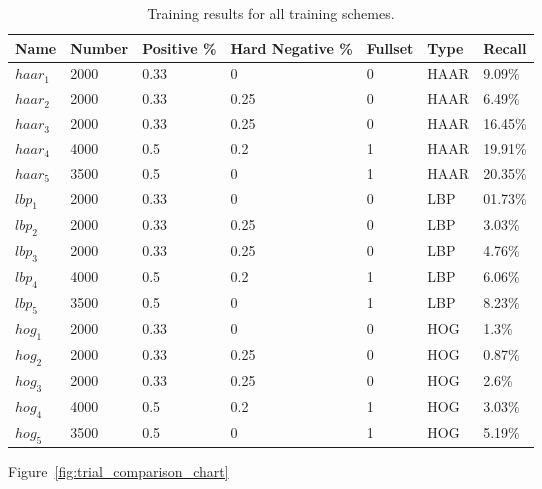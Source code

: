 \documentclass{llncs}
\begin{document}
{		\begin{table}[H]
			\centering
			\caption{Training results for all training schemes.}
			\label{tab:training_results}
			\begin{tabularx}{\textwidth}{XXllXXX}
				\toprule
				\textbf{Name} & \textbf{Number} & \textbf{Positive \%} & \textbf{Hard Negative \%} & \textbf{Fullset} & \textbf{Type} & \textbf{Recall} \\
				\midrule
					\(haar_1\) & 2000 & 0.33 & 0 & 0 & HAAR & 9.09\% \\
					\(haar_2\) & 2000 & 0.33 & 0.25 & 0 & HAAR & 6.49\% \\
					\(haar_3\) & 2000 & 0.33 & 0.25 & 0 & HAAR & 16.45\% \\
					\(haar_4\) & 4000 & 0.5 & 0.2 & 1 & HAAR & 19.91\% \\
					\(haar_5\) & 3500 & 0.5 & 0 & 1 & HAAR & 20.35\% \\
					\(lbp_1\) & 2000 & 0.33 & 0 & 0 & LBP & 01.73\% \\
					\(lbp_2\) & 2000 & 0.33 & 0.25 & 0 & LBP & 3.03\% \\
					\(lbp_3\) & 2000 & 0.33 & 0.25 & 0 & LBP & 4.76\% \\
					\(lbp_4\) & 4000 & 0.5 & 0.2 & 1 & LBP & 6.06\% \\
					\(lbp_5\) & 3500 & 0.5 & 0 & 1 & LBP & 8.23\% \\
					\(hog_1\) & 2000 & 0.33 & 0 & 0 & HOG & 1.3\% \\
					\(hog_2\) & 2000 & 0.33 & 0.25 & 0 & HOG & 0.87\% \\
					\(hog_3\) & 2000 & 0.33 & 0.25 & 0 & HOG & 2.6\% \\
					\(hog_4\) & 4000 & 0.5 & 0.2 & 1 & HOG & 3.03\% \\
					\(hog_5\) & 3500 & 0.5 & 0 & 1 & HOG & 5.19\% \\
				\bottomrule
			\end{tabularx}
		\end{table}

		Figure~\ref{fig:trial_comparison_chart}

}
\end{document}
